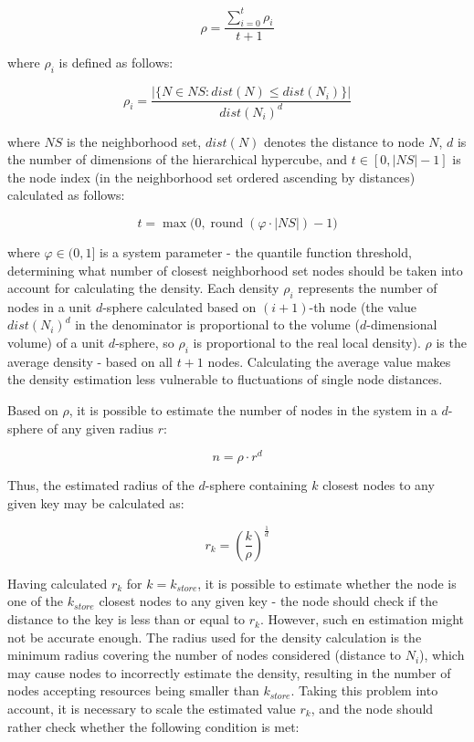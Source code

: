 \begin{equation}
\rho = \frac{\sum_{i=0}^{t} \rho_i}{t+1}
\end{equation}

\noindent
where $\rho_i$ is defined as follows:

\begin{equation}
\rho_i = \frac{\left|\{N \in NS : dist(N) \leq dist(N_i)\}\right|}{dist(N_i)^d}
\end{equation}

\noindent
where $NS$ is the neighborhood set, $dist(N)$ denotes the distance to node $N$, $d$ is the number of dimensions of the hierarchical hypercube, and $t \in [0, |NS|-1]$ is the node index (in the neighborhood set ordered ascending by distances) calculated as follows:

\begin{equation}
t = \max \big(0, \mathop{\mathrm{round}}(\varphi \cdot |NS|) - 1 \big)
\end{equation}

\noindent
where $\varphi \in (0,1]$ is a system parameter - the quantile function threshold, determining what number of closest neighborhood set nodes should be taken into account for calculating the density. Each density $\rho_i$ represents the number of nodes in a unit $d$-sphere calculated based on $(i+1)$-th node (the value $dist(N_i)^d$ in the denominator is proportional to the volume ($d$-dimensional volume) of a unit $d$-sphere, so $\rho_i$ is proportional to the real local density). $\rho$ is the average density - based on all $t+1$ nodes. Calculating the average value makes the density estimation less vulnerable to fluctuations of single node distances.

Based on $\rho$, it is possible to estimate the number of nodes in the system in a $d$-sphere of any given radius $r$:

\begin{equation}
n = \rho \cdot r^d
\end{equation}

\noindent
Thus, the estimated radius of the $d$-sphere containing $k$ closest nodes to any given key may be calculated as:

\begin{equation}
r_k = \left(\frac{k}{\rho}\right)^{\frac{1}{d}}
\end{equation}

Having calculated $r_k$ for $k = k_{store}$, it is possible to estimate whether the node is one of the $k_{store}$ closest nodes to any given key - the node should check if the distance to the key is less than or equal to $r_k$. However, such en estimation might not be accurate enough. The radius used for the density calculation is the minimum radius covering the number of nodes considered (distance to $N_i$), which may cause nodes to incorrectly estimate the density, resulting in the number of nodes accepting resources being smaller than $k_{store}$. Taking this problem into account, it is necessary to scale the estimated value $r_k$, and the node should rather check whether the following condition is met:

